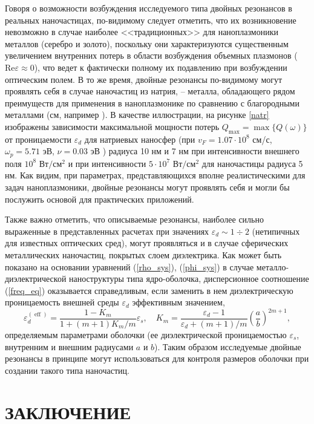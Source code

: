 \documentclass[12pt, a4paper]{article}
\def \eps {\varepsilon}
\def \w {\omega}
\begin{document}
Говоря о возможности возбуждения исследуемого типа двойных резонансов в реальных наночастицах, по-видимому следует отметить, что их возникновение невозможно в случае наиболее <<традиционных>> для наноплазмоники металлов (серебро и золото), поскольку они характеризуются существенным увеличением внутренних потерь в области возбуждения объемных плазмонов ($\textrm{Re}\eps \approx 0$), что ведет к фактически полному их подавлению при возбуждении оптическим полем.
В то же время, двойные резонансы по-видимому могут проявлять себя в случае наночастиц из натрия, -- металла, обладающего рядом преимуществ для применения в наноплазмонике по сравнению с благородными металлами (см, например \cite{Arboleda2016, Blaber2009}).
В качестве иллюстрации, на рисунке \ref{natr} изображены зависимости максимальной мощности потерь $Q_\textrm{max} = \max\{Q(\w)\}$ от проницаемости $\eps_d$ для натриевых наносфер (при $v_F = 1.07\cdot10^8$ см/с, $\w_p = 5.71$ эВ, $\nu = 0.03$ эВ \cite{ Blaber2009}) радиуса 10 нм и 7 нм при интенсивности внешнего поля $10^8$ $\text{Вт}/\text{см}^2$ и при интенсивности $5 \cdot 10^7$ $\text{Вт}/\text{см}^2$ для наночастицы радиуса 5 нм.
Как видим, при параметрах, представляющихся вполне реалистическими для задач наноплазмоники, двойные резонансы могут проявлять себя и могли бы послужить основой для практических приложений. 

Также важно отметить, что описываемые резонансы, наиболее сильно выраженные в представленных расчетах при значениях $\eps_d \sim 1\div2$ (нетипичных для известных оптических сред), могут проявляться и в случае сферических металлических наночастиц, покрытых слоем диэлектрика.
Как может быть показано на основании уравнений (\ref{rho_sys}), (\ref{phi_sys}) в случае металло-диэлектрической наноструктуры типа ядро-оболочка, дисперсионное соотношение (\ref{freq_eq}) оказывается справедливым, если заменить в нем диэлектрическую проницаемость внешней среды $\eps_d$ эффективным значением, 
\begin{equation} 	
\eps_d^{(\operatorname{eff})} = \frac{1-K_m}{1 + (m+1)K_m/m}\eps_s , \quad K_m = \frac{\eps_d - 1}{\eps_d + (m+1)/m}\left(\frac{a}{b}\right)^{2m+1} ,
\end{equation}
определяемым параметрами оболочки (ее диэлектрической проницаемостью $\eps_s$, внутренним и внешним радиусами $a$ и $b$). Таким образом исследуемые двойные резонансы в принципе могут использоваться для контроля размеров оболочки при создании такого типа наночастиц.


\section{ЗАКЛЮЧЕНИЕ}
\end{document}
